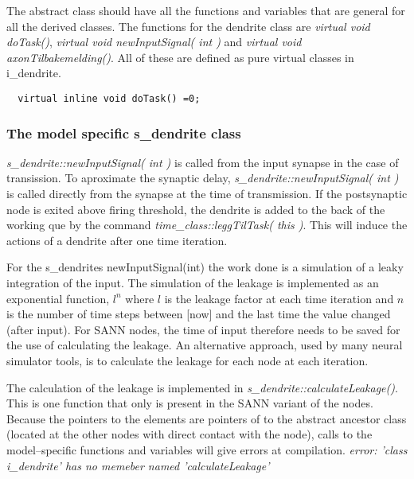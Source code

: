 	The abstract class should have all the functions and variables that are general for all the derived classes. 
	The functions for the dendrite class are \emph{virtual void doTask()}, \emph{virtual void newInputSignal( int )} and \emph{virtual void axonTilbakemelding()}. 
	All of these are defined as pure virtual classes in i\_dendrite.

\begin{lstlisting}
  virtual inline void doTask() =0;
\end{lstlisting}

	\subsubsection{The model specific s\_dendrite class}
	
	\emph{s\_dendrite::newInputSignal( int )} is called from the input synapse in the case of transission. 
	To aproximate the synaptic delay, \emph{s\_dendrite::newInputSignal( int )} is called directly from the synapse at the time of transmission.
	If the postsynaptic node is exited above firing threshold, the dendrite is added to the back of the working que by the command \emph{time\_class::leggTilTask( this )}. 
	This will induce the actions of a dendrite after one time iteration.


	For the s\_dendrites newInputSignal(int) the work done is a simulation of a leaky integration of the input. 
	The simulation of the leakage is implemented as an exponential function, $l^n$ where $l$ is the leakage factor at each time iteration and $n$ is the number of time steps between [now] and the last time the value changed (after input).
	For SANN nodes, the time of input therefore needs to be saved for the use of calculating the leakage. An alternative approach, used by many neural simulator tools, is to calculate the leakage for each node at each iteration.
	
	The calculation of the leakage is implemented in \emph{s\_dendrite::calculateLeakage()}. This is one function that only is present in the SANN variant of the nodes. 
	Because the pointers to the elements are pointers of to the abstract ancestor class (located at the other nodes with direct contact with the node), calls to the model--specific functions and variables will give errors at compilation.
	\newline \emph{error: 'class i\_dendrite' has no memeber named 'calculateLeakage'}

